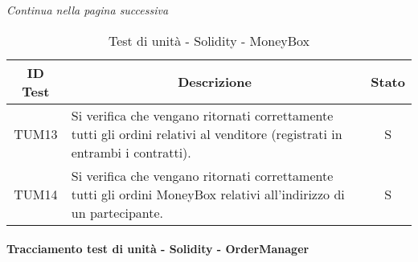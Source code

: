 \begin{center}
  \textit{\small Continua nella pagina successiva}
\end{center}
\begin{table}[H]
  \centering
  \renewcommand{\arraystretch}{1.8}
  \begin{tabular}{c|p{10cm}|c}
    \rowcolor[HTML]{125E28}
    \color[HTML]{FFFFFF}\textbf{ID Test}
          & \multicolumn{1}{c}{\color[HTML]{FFFFFF}\textbf{Descrizione}}
          & \color[HTML]{FFFFFF}\textbf{Stato}                                                                                               \\
    \hline
    TUM13 & Si verifica che vengano ritornati correttamente tutti gli ordini relativi al venditore (registrati in entrambi i contratti). & S \\
    TUM14 & Si verifica che vengano ritornati correttamente tutti gli ordini MoneyBox\glo{} relativi all'indirizzo di un partecipante.   & S \\
  \end{tabular}
  \caption{Test di unità - Solidity - MoneyBox}
\end{table}



\paragraph{Tracciamento test di unità - Solidity - OrderManager}\label{paragraph:tracciamento_TUM}

